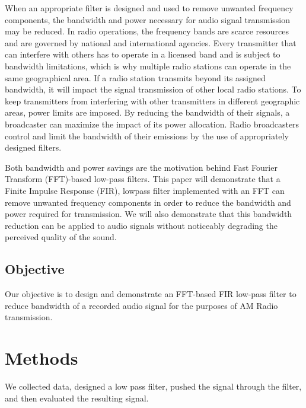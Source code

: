 When an appropriate filter is designed and used to remove
unwanted frequency components, the bandwidth and power
necessary for audio signal transmission may be reduced. In
radio operations, the frequency bands are scarce resources and
are governed by national and international agencies. Every
transmitter that can interfere with others has to operate in a
licensed band and is subject to bandwidth limitations, which is
why multiple radio stations can operate in the same geographical
area. If a radio station transmits beyond its assigned bandwidth,
it will impact the signal transmission of other local radio
stations. To keep transmitters from interfering with other
transmitters in different geographic areas, power limits are
imposed. By reducing the bandwidth of their signals, a
broadcaster can maximize the impact of its power allocation.
Radio broadcasters control and limit the bandwidth of their
emissions by the use of appropriately designed  
filters\cite{notes:class}.

Both bandwidth and power savings are the motivation behind Fast
Fourier Transform (FFT)-based low-pass filters. This paper will
demonstrate that a Finite Impulse Response (FIR), lowpass filter
implemented with an FFT can remove unwanted frequency components in
order to reduce the bandwidth and power required for  
transmission.  We will also demonstrate that this bandwidth reduction
can be applied to audio signals without noticeably degrading the 
perceived quality of the sound.

\subsection{Objective}

Our objective is to design and demonstrate an FFT-based FIR
low-pass filter to reduce bandwidth of a recorded audio signal
for the purposes of AM Radio transmission.

\section{Methods}

We collected data, designed a low pass filter, pushed the signal
through the filter, and then evaluated the resulting signal.







